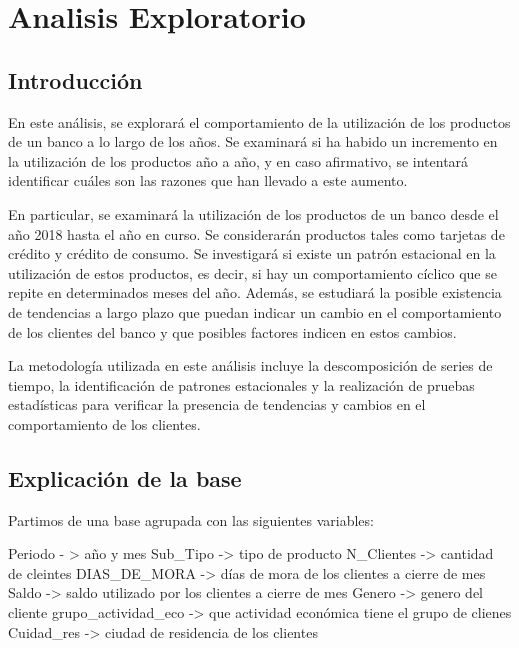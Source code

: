 \documentclass[
]{book}
\begin{document}
\hypertarget{Analisis}{%
\chapter{Analisis Exploratorio}\label{Analisis}}

\hypertarget{introducciuxf3n}{%
\section{Introducción}\label{introducciuxf3n}}

En este análisis, se explorará el comportamiento de la utilización de los productos de un banco a lo largo de los años. Se examinará si ha habido un incremento en la utilización de los productos año a año, y en caso afirmativo, se intentará identificar cuáles son las razones que han llevado a este aumento.

En particular, se examinará la utilización de los productos de un banco desde el año 2018 hasta el año en curso. Se considerarán productos tales como tarjetas de crédito y crédito de consumo. Se investigará si existe un patrón estacional en la utilización de estos productos, es decir, si hay un comportamiento cíclico que se repite en determinados meses del año. Además, se estudiará la posible existencia de tendencias a largo plazo que puedan indicar un cambio en el comportamiento de los clientes del banco y que posibles factores indicen en estos cambios.

La metodología utilizada en este análisis incluye la descomposición de series de tiempo, la identificación de patrones estacionales y la realización de pruebas estadísticas para verificar la presencia de tendencias y cambios en el comportamiento de los clientes.

\hypertarget{explicaciuxf3n-de-la-base}{%
\section{Explicación de la base}\label{explicaciuxf3n-de-la-base}}

Partimos de una base agrupada con las siguientes variables:

Periodo - \textgreater{} año y mes
Sub\_Tipo -\textgreater{} tipo de producto
N\_Clientes -\textgreater{} cantidad de cleintes
DIAS\_DE\_MORA -\textgreater{} días de mora de los clientes a cierre de mes
Saldo -\textgreater{} saldo utilizado por los clientes a cierre de mes
Genero -\textgreater{} genero del cliente
grupo\_actividad\_eco -\textgreater{} que actividad económica tiene el grupo de clienes
Cuidad\_res -\textgreater{} ciudad de residencia de los clientes
\end{document}
